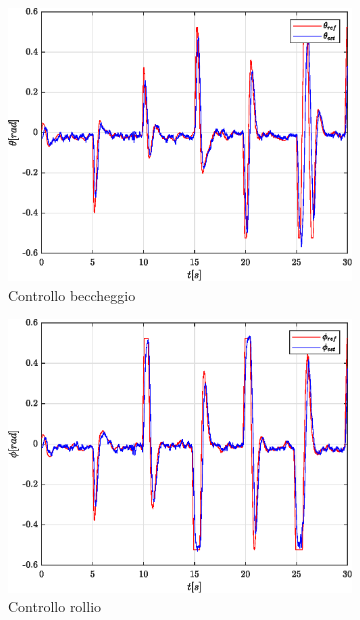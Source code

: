 \begin{figure}
	\centering
	\begin{subfigure}{0.45\textwidth}
		\centering
		\includegraphics[width=1\textwidth]{Simulazioni/Figure/SMC/BUTTERFLY/AttitudeControlPitch}
		\caption{Controllo beccheggio}
	\end{subfigure}
	\hfill
	\begin{subfigure}{0.45\textwidth}
		\centering
		\includegraphics[width=1\textwidth]{Simulazioni/Figure/SMC/BUTTERFLY/AttitudeControlRoll}
		\caption{Controllo rollio}
	\end{subfigure}
	\hfill
	\begin{subfigure}{0.45\textwidth}

\end{subfigure}
\end{figure}
